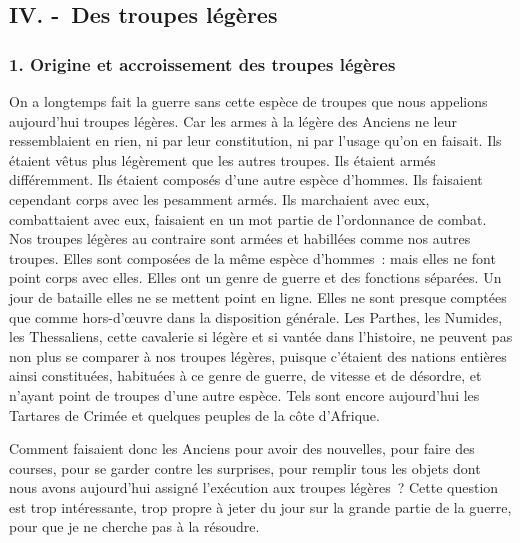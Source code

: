 \documentclass[french,twoside]{book} %
\begin{document}
\subsection[{IV. - Des troupes légères}]{IV. - Des troupes légères}
\subsubsection[{1. Origine et accroissement des troupes légères}]{1. Origine et accroissement des troupes légères}
\noindent On a longtemps fait la guerre sans cette espèce de troupes que nous appelions aujourd’hui troupes légères. Car les armes à la légère des Anciens ne leur ressemblaient en rien, ni par leur constitution, ni par l’usage qu’on en faisait. Ils étaient vêtus plus légèrement que les autres troupes. Ils étaient armés différemment. Ils étaient composés d’une autre espèce d’hommes. Ils faisaient cependant corps avec les pesamment armés. Ils marchaient avec eux, combattaient avec eux, faisaient en un mot partie de l’ordonnance de combat. Nos troupes légères au contraire sont armées et habillées comme nos autres troupes. Elles sont composées de la même espèce d’hommes : mais elles ne font point corps avec elles. Elles ont un genre de guerre et des fonctions séparées. Un jour de bataille elles ne se mettent point en ligne. Elles ne sont presque comptées que comme hors-d’œuvre dans la disposition générale. Les Parthes, les Numides, les Thessaliens, cette cavalerie si légère et si vantée dans l’histoire, ne peuvent pas non plus se comparer à nos troupes légères, puisque c’étaient des nations entières ainsi constituées, habituées à ce genre de guerre, de vitesse et de désordre, et n’ayant point de troupes d’une autre espèce. Tels sont encore aujourd’hui les Tartares de Crimée et quelques peuples de la côte d’Afrique.\par
Comment faisaient donc les Anciens pour avoir des nouvelles, pour faire des courses, pour se garder contre les surprises, pour remplir tous les objets dont nous avons aujourd’hui assigné l’exécution aux troupes légères ? Cette question est trop intéressante, trop propre à jeter du jour sur la grande partie de la guerre, pour que je ne cherche pas à la résoudre.\par
\end{document}
